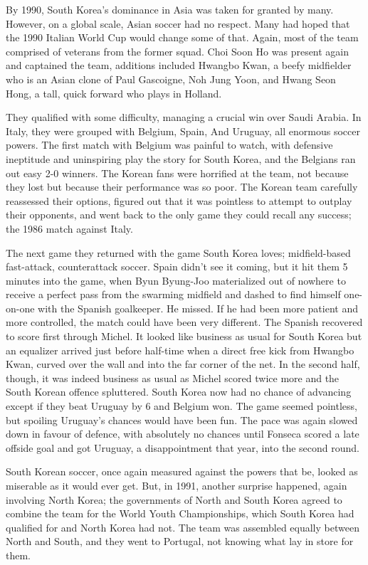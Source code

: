 By 1990, South Korea's dominance in Asia was taken for granted by many. 
However, on a global scale, Asian soccer had no respect. Many had hoped that 
the 1990 Italian World Cup would change some of that. Again, most of the team 
comprised of veterans from the former squad. Choi Soon Ho was present again and
captained the team, additions included Hwangbo Kwan, a beefy midfielder who is
an Asian clone of Paul Gascoigne, Noh Jung Yoon, and Hwang Seon Hong, a tall, 
quick forward who plays in Holland.

They qualified with some difficulty, managing a crucial win over Saudi Arabia. 
In Italy, they were grouped with Belgium, Spain, And Uruguay, all enormous 
soccer powers. The first match with Belgium was painful to watch, with 
defensive ineptitude and uninspiring play the story for South Korea, and the 
Belgians ran out easy 2-0 winners. The Korean fans were horrified at the team, 
not because they lost but because their performance was so poor. The Korean 
team carefully reassessed their options, figured out that it was pointless to 
attempt to outplay their opponents, and went back to the only game they could 
recall any success; the 1986 match against Italy.

The next game they returned with the game South Korea loves; midfield-based
fast-attack, counterattack soccer. Spain didn't see it coming, but it hit them
5 minutes into the game, when Byun Byung-Joo materialized out of nowhere to 
receive a perfect pass from the swarming midfield and dashed to find himself
one-on-one with the Spanish goalkeeper. He missed. If he had been more patient
and more controlled, the match could have been very different. The Spanish 
recovered to score first through Michel. It looked like business as usual for
South Korea but an equalizer arrived just before half-time when a direct free 
kick from Hwangbo Kwan, curved over the wall and into the far corner of the 
net. In the second half, though, it was indeed business as usual as Michel 
scored twice more and the South Korean offence spluttered. South Korea now had 
no chance of advancing except if they beat Uruguay by 6 and Belgium won. The 
game seemed pointless, but spoiling Uruguay's chances would have been fun. The 
pace was again slowed down in favour of defence, with absolutely no chances 
until Fonseca scored a late offside goal and got Uruguay, a disappointment that
year, into the second round.

South Korean soccer, once again measured against the powers that be, looked as
miserable as it would ever get. But, in 1991, another surprise happened, again
involving North Korea; the governments of North and South Korea agreed to 
combine the team for the World Youth Championships, which South Korea had 
qualified for and North Korea had not. The team was assembled equally between 
North and South, and they went to Portugal, not knowing what lay in store for 
them.

